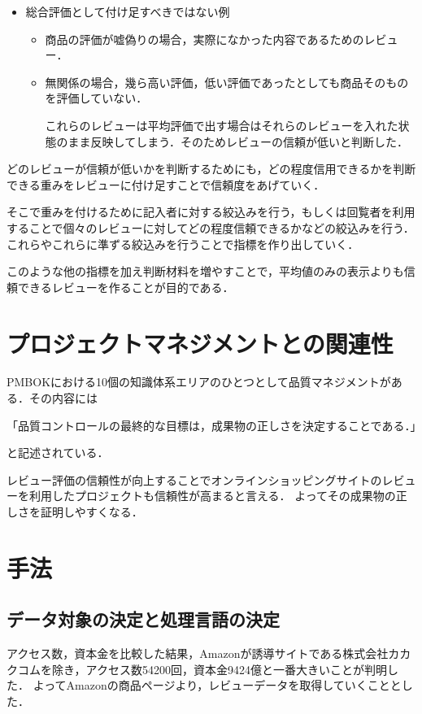 \begin{itemize}

 \item	総合評価として付け足すべきではない例

\begin{itemize}
\setlength{\parskip}{3mm}
 \item	商品の評価が嘘偽りの場合，実際になかった内容であるためのレビュー．
 \item	無関係の場合，幾ら高い評価，低い評価であったとしても商品そのものを評価していない．

これらのレビューは平均評価で出す場合はそれらのレビューを入れた状態のまま反映してしまう．そのためレビューの信頼が低いと判断した．


\end{itemize}

\end{itemize}


どのレビューが信頼が低いかを判断するためにも，どの程度信用できるかを判断できる重みをレビューに付け足すことで信頼度をあげていく．

そこで重みを付けるために記入者に対する絞込みを行う，もしくは回覧者を利用することで個々のレビューに対してどの程度信頼できるかなどの絞込みを行う．
これらやこれらに準ずる絞込みを行うことで指標を作り出していく．

このような他の指標を加え判断材料を増やすことで，平均値のみの表示よりも信頼できるレビューを作ることが目的である．


\chapter{プロジェクトマネジメントとの関連性}


PMBOKにおける10個の知識体系エリアのひとつとして品質マネジメントがある．その内容には

「品質コントロールの最終的な目標は，成果物の正しさを決定することである．」\cite{pmbok2013}

と記述されている．

レビュー評価の信頼性が向上することでオンラインショッピングサイトのレビューを利用したプロジェクトも信頼性が高まると言える．
よってその成果物の正しさを証明しやすくなる．




\chapter{手法}

\section{データ対象の決定と処理言語の決定}
アクセス数，資本金を比較した結果，Amazonが誘導サイトである株式会社カカクコムを除き，アクセス数54200回，資本金9424億と一番大きいことが判明した．
よってAmazonの商品ページより，レビューデータを取得していくこととした．

